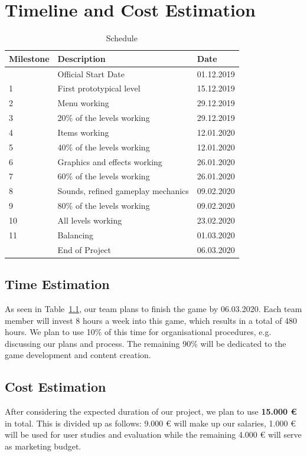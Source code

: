 \documentclass[a4paper]{scrreprt}
\begin{document}

\chapter{Timeline and Cost Estimation}

\begin{table}[h]
\centering
\begin{tabular}{|l|l|l|}
\hline
Milestone & Description & Date \\\hline
& Official Start Date & 01.12.2019 \\
1 & First prototypical level  & 15.12.2019 \\
2 & Menu working  & 29.12.2019 \\
3 & 20\% of the levels working  & 29.12.2019 \\
4 & Items working  & 12.01.2020 \\
5 & 40\% of the levels working  & 12.01.2020 \\
6 & Graphics and effects working  & 26.01.2020 \\
7 & 60\% of the levels working  & 26.01.2020 \\
8 & Sounds, refined gameplay mechanics & 09.02.2020 \\
9 & 80\% of the levels working  & 09.02.2020 \\
10 & All levels working  & 23.02.2020 \\
11 & Balancing  & 01.03.2020 \\
& End of Project & 06.03.2020 \\
\hline
\end{tabular}
\caption{\label{tab:schedule} Schedule}
\end{table}

\section{Time Estimation}
As seen in Table~\ref{tab:schedule}, our team plans to finish the game by 06.03.2020. Each team member will invest 8 hours a week into this game, which results in a total of 480 hours. We plan to use 10\% of this time for organisational procedures, e.g. discussing our plans and process. The remaining 90\% will be dedicated to the game development and content creation. 

\section{Cost Estimation}
After considering the expected duration of our project, we plan to use \textbf{15.000 {\euro}} in total. This is divided up as follows: 9.000 {\euro} will make up our salaries, 1.000 {\euro} will be used for user studies and evaluation while the remaining 4.000 {\euro} will serve as marketing budget. 
\end{document}
